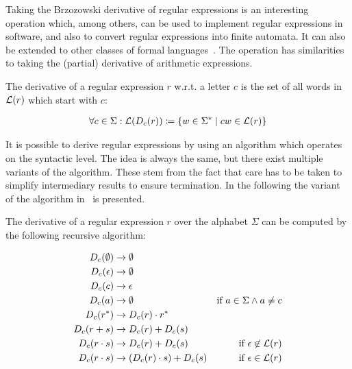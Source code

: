 Taking the Brzozowski derivative of regular expressions is an interesting operation which, among others, can be used
to implement regular expressions in software, and also to convert regular expressions into finite automata.
It can also be extended to other classes of formal languages~\cite{parsing-with-derivatives}.
The operation has similarities to taking the (partial) derivative of arithmetic expressions.

\begin{definition}
    The derivative of a regular expression $r$ w.r.t. a letter $c$ is
    the set of all words in $\mathcal{L}(r)$ which start with $c$:

    \begin{align}
        \forall c \in \Sigma: \mathcal{L}(D_c(r)) \coloneqq \{ w \in \Sigma^\ast \mid c w \in \mathcal{L}(r) \}
    \end{align}
\end{definition}

It is possible to derive regular expressions by using an algorithm which operates on the syntactic level.
The idea is always the same, but there exist multiple variants of the algorithm.
These stem from the fact that care has to be taken to simplify intermediary results to ensure termination.
In the following the variant of the algorithm in~\cite{proof-pearl-regular-expression-equivalence} is presented.

\begin{definition}
    The derivative of a regular expression $r$ over the alphabet $\Sigma$
    can be computed by the following recursive algorithm:

    \begin{align}
        D_c(\emptyset)  &\rightarrow \emptyset \\
        D_c(\epsilon)   &\rightarrow \emptyset \\
        D_c(c)          &\rightarrow \epsilon \\
        D_c(a)          &\rightarrow \emptyset                 & \text{if } a \in \Sigma \land a \neq c \\
        D_c(r^\ast)     &\rightarrow D_c(r) \cdot r^\ast \\
        D_c(r + s)      &\rightarrow D_c(r) + D_c(s) \\
        D_c(r \cdot s)  &\rightarrow D_c(r) + D_c(s)           & \text{if } \epsilon \not\in \mathcal{L}(r) \\
        D_c(r \cdot s)  &\rightarrow (D_c(r) \cdot s) + D_c(s) & \text{if } \epsilon \in \mathcal{L}(r)
    \end{align}
\end{definition}

